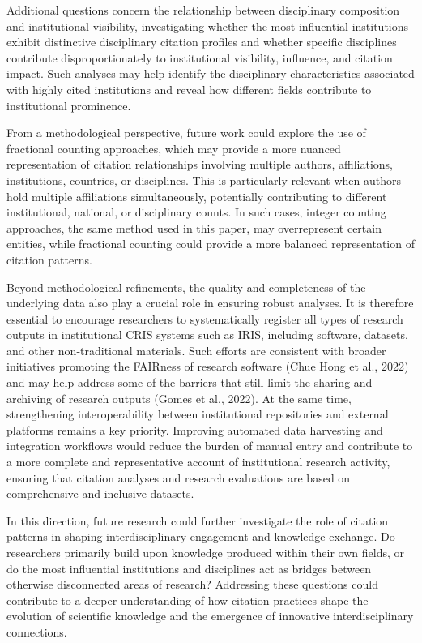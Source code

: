 \documentclass[year=2026]{cup-journal}
\begin{document}
Additional questions concern the relationship between disciplinary composition and institutional visibility, investigating whether the most influential institutions exhibit distinctive disciplinary citation profiles and whether specific disciplines contribute disproportionately to institutional visibility, influence, and citation impact. Such analyses may help identify the disciplinary characteristics associated with highly cited institutions and reveal how different fields contribute to institutional prominence.

From a methodological perspective, future work could explore the use of fractional counting approaches, which may provide a more nuanced representation of citation relationships involving multiple authors, affiliations, institutions, countries, or disciplines. This is particularly relevant when authors hold multiple affiliations simultaneously, potentially contributing to different institutional, national, or disciplinary counts. In such cases, integer counting approaches, the same method used in this paper, may overrepresent certain entities, while fractional counting could provide a more balanced representation of citation patterns. 

Beyond methodological refinements, the quality and completeness of the underlying data also play a crucial role in ensuring robust analyses. It is therefore essential to encourage researchers to systematically register all types of research outputs in institutional CRIS systems such as IRIS, including software, datasets, and other non-traditional materials. Such efforts are consistent with broader initiatives promoting the FAIRness of research software (Chue Hong et al., 2022) and may help address some of the barriers that still limit the sharing and archiving of research outputs (Gomes et al., 2022). At the same time, strengthening interoperability between institutional repositories and external platforms remains a key priority. Improving automated data harvesting and integration workflows would reduce the burden of manual entry and contribute to a more complete and representative account of institutional research activity, ensuring that citation analyses and research evaluations are based on comprehensive and inclusive datasets. 

In this direction, future research could further investigate the role of citation patterns in shaping interdisciplinary engagement and knowledge exchange. Do researchers primarily build upon knowledge produced within their own fields, or do the most influential institutions and disciplines act as bridges between otherwise disconnected areas of research? Addressing these questions could contribute to a deeper understanding of how citation practices shape the evolution of scientific knowledge and the emergence of innovative interdisciplinary connections.
\end{document}
